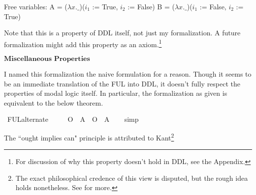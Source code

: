 \begin{isabellebody}
{  Free variables:
    A = ($\lambda x. \_$)($i_1$ := True, $i_2$ := False)
    B = ($\lambda x. \_$)($i_1$ := False, $i_2$ := True)\color{black}%
}%
\endisatagproof
{\isafoldproof}%
%
\isadelimproof
%
\endisadelimproof
%
\begin{isamarkuptext}%
Note that this is a property of DDL itself, not just my formalization. A future formalization might 
add this property as an axiom.\footnote{For discussion of why this property doesn't hold in DDL, see the Appendix.}%
\end{isamarkuptext}\isamarkuptrue%
%
\begin{isamarkuptext}%
$\textbf{Miscellaneous Properties}$%
\end{isamarkuptext}\isamarkuptrue%
%
\begin{isamarkuptext}%
I named this formalization the naive formulation for a reason. Though it seems to be an immediate
translation of the FUL into DDL, it doesn't fully respect the properties of modal logic itself. In particular, the 
formalization as given is equivalent to the below theorem.%
\end{isamarkuptext}\isamarkuptrue%
\isamarkupfalse%
\ FUL{\isacharunderscore}alternate{\isacharcolon}\isanewline
\ \ \ {\isachardoublequoteopen}{\isasymTurnstile}\ {\isacharparenleft}{\isacharparenleft}{\isasymdiamond}\ {\isacharparenleft}O\ {\isacharbraceleft}\isactrlbold {\isasymnot}\ A{\isacharbraceright}{\isacharparenright}{\isacharparenright}\ \isactrlbold {\isasymrightarrow}\ {\isacharparenleft}O\ {\isacharbraceleft}\isactrlbold {\isasymnot}\ A{\isacharbraceright}{\isacharparenright}{\isacharparenright}{\isachardoublequoteclose}\isanewline
%
\isadelimproof
\ \ %
\endisadelimproof
%
\isatagproof
{}\isamarkupfalse%
\ simp\isanewline
%
\isanewline
%
%
\endisatagproof
{\isafoldproof}%
%
\isadelimproof
%
\endisadelimproof
%
\begin{isamarkuptext}%
The ``ought implies can" principle is attributed to Kant\footnote{The exact philosophical credence of this view is disputed, but the rough idea holds nonetheless. See \cite{kohl} for more.}

\end{isamarkuptext}
\end{isabellebody}
